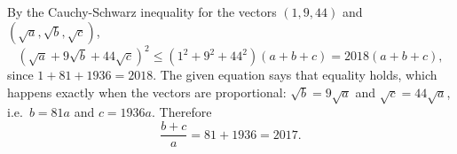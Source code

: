By the Cauchy-Schwarz inequality for the vectors $(1,9,44)$ and $\left(\sqrt a,\sqrt b,\sqrt c\right)$,
\[
\left(\sqrt a+9\sqrt b+44\sqrt c\right)^2\le\left(1^2+9^2+44^2\right)(a+b+c)=2018(a+b+c),
\]
since $1+81+1936=2018$. The given equation says that equality holds, which happens exactly when the vectors are proportional: $\sqrt b=9\sqrt a$ and $\sqrt c=44\sqrt a$, i.e.\ $b=81a$ and $c=1936a$. Therefore
\[
\dfrac{b+c}{a}=81+1936=\boxed{2017}.
\]
